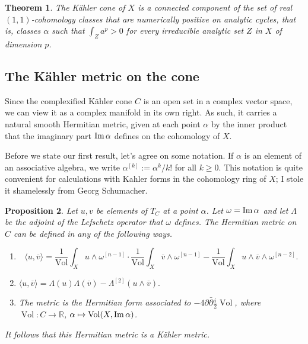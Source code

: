 \documentclass[11pt,a4paper]{amsart}
\newtheorem{theo}{Theorem}[section]
\newtheorem{prop}[theo]{Proposition}
\theoremstyle{definition}
\theoremstyle{remark}
\newcommand{\RR}{\mathbb{R}}
\newcommand{\Vol}{\mathop{\mathrm{Vol}}}
\def\Im{\mathop{\rm Im}}
\def\ov#1{\overline{#1}}
\def\d{\partial}
\def\dbar{\bar\partial}
\def\met#1#2{\langle #1, \ov{#2} \rangle}
\def\Lef{\Lambda}
\def\q#1{\frac{1}{\Vol}\int_X #1 \wedge \kf\^{n-1}}
\def\qq#1#2{\frac{1}{\Vol}\int_X #1 \wedge #2 \wedge \kf\^{n-2}}
\def\kf{\omega}
\def\ckf{\alpha}
\def\ton{u}
\def\ttw{v}
\def\^#1{^{[#1]}}
\begin{document}
\begin{theo}
The K\"{a}hler cone of $X$ is a connected component of the set of real
$(1,1)$-cohomology classes that are numerically positive on analytic
cycles, that is, classes $\alpha$ such that $\int_{Z} a^p > 0$ for every
irreducible analytic set $Z$ in $X$ of dimension $p$.
\end{theo}


\subsection*{The K\"{a}hler metric on the cone}

Since the complexified K\"{a}hler cone $C$ is an open set in a complex
vector space, we can view it as a complex manifold in its own right.
As such, it carries a natural smooth Hermitian metric, given at each
point $\ckf$ by the inner product that the imaginary part $\Im\ckf$
defines on the cohomology of $X$.

Before we state our first result, let's agree on some notation. If
$\alpha$ is an element of an associative algebra, we write $\alpha\^k
:= \alpha^k/k!$ for all $k \geq 0$. This notation is quite convenient
for calculations with Kahler forms in the cohomology ring of $X$; I
stole it shamelessly from Georg Schumacher.


\begin{prop}
Let $\ton,\ttw$ be elements of $T_C$ at a point $\ckf$. Let $\kf =
\Im\ckf$ and let $\Lef$ be the adjoint of the Lefschetz operator that
$\kf$ defines.  The Hermitian metric on $C$ can be defined in any of the
following ways.
\begin{enumerate}
    \item 
$$
\met{\ton}{\ttw}
= \q{\ton} \cdot \q{\ov{\ttw}}
- \qq{\ton}{\ov\ttw}.
$$
    \item
\hfil
$
\met{\ton}{\ttw}
= \Lef(\ton)\Lef(\ov\ttw)
- \Lef\^2(\ton\wedge\ov\ttw).
$
\hfil
    \item
The metric is the Hermitian form associated to 
$-4\d\dbar\frac{i}{2}\Vol$, where $\Vol : C \to \RR$, $\ckf \mapsto
\Vol(X,\Im\ckf)$.
\end{enumerate}
It follows that this Hermitian metric is a K\"{a}hler metric.
\end{prop}
\end{document}
